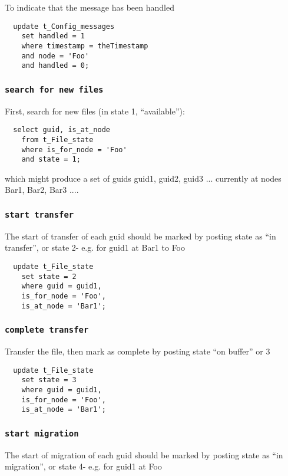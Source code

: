 \documentclass{cmspaper}
\begin{document}
To indicate that the message has been handled

{\small\begin{verbatim}
  update t_Config_messages
  	set handled = 1
  	where timestamp = theTimestamp
  	and node = 'Foo'
  	and handled = 0;
\end{verbatim}}

\subsubsection{\textbf{\texttt{search for new files}}}
First, search for new files (in state 1, ``available''):

{\small\begin{verbatim}
  select guid, is_at_node
    from t_File_state
    where is_for_node = 'Foo'
    and state = 1;
\end{verbatim}}

which might produce a set of guids {guid1, guid2, guid3 ...} currently at nodes {Bar1, Bar2, Bar3 ...}. 

\subsubsection{\textbf{\texttt{start transfer}}}
The start of transfer of each guid should be marked by posting state as ``in transfer'', or state 2- e.g. for guid1 at Bar1 to Foo

{\small\begin{verbatim}
  update t_File_state
    set state = 2
    where guid = guid1,
    is_for_node = 'Foo',
    is_at_node = 'Bar1';
  \end{verbatim}}

\subsubsection{\textbf{\texttt{complete transfer}}}
Transfer the file, then mark as complete by posting state ``on buffer'' or 3

{\small\begin{verbatim}
  update t_File_state
    set state = 3
    where guid = guid1,
    is_for_node = 'Foo',
    is_at_node = 'Bar1';
\end{verbatim}}

\subsubsection{\textbf{\texttt{start migration}}}
The start of migration of each guid should be marked by posting state as ``in migration'', or state 4- e.g. for guid1 at Foo
\end{document}

